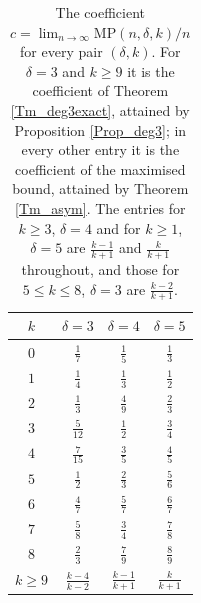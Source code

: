 \documentclass[12pt,a4paper]{article}%
\begin{document}
\begin{table}[htbp]
\begin{center}
\begin{tabular}{|c|c|c|c|}
\hline
$k$ & $\delta =3$ & $\delta =4$ & $\delta =5$\\ \hline
$0$ & $\frac{1}{7}$ & $\frac{1}{5}$ & $\frac{1}{3}$\\[1mm]
$1$ & $\frac{1}{4}$ & $\frac{1}{3}$ & $\frac{1}{2}$\\[1mm]
$2$ & $\frac{1}{3}$ & $\frac{4}{9}$ & $\frac{2}{3}$\\[1mm]
$3$ & $\frac{5}{12}$ & $\frac{1}{2}$ & $\frac{3}{4}$\\[1mm]
$4$ & $\frac{7}{15}$ & $\frac{3}{5}$ & $\frac{4}{5}$\\[1mm]
$5$ & $\frac{1}{2}$ & $\frac{2}{3}$ & $\frac{5}{6}$\\[1mm]
$6$ & $\frac{4}{7}$ & $\frac{5}{7}$ & $\frac{6}{7}$\\[1mm]
$7$ & $\frac{5}{8}$ & $\frac{3}{4}$ & $\frac{7}{8}$\\[1mm]
$8$ & $\frac{2}{3}$ & $\frac{7}{9}$ & $\frac{8}{9}$\\[1mm]
$k\geq 9$ & $\frac{k-4}{k-2}$ & $\frac{k-1}{k+1}$ & $\frac{k}{k+1}$\\ \hline
\end{tabular}
\end{center}
\caption{The coefficient $c=\lim_{n\to \infty }\mathrm{MP}(n,\delta ,k)/n$ for every pair
$(\delta ,k)$. For $\delta =3$ and $k\geq 9$ it is the coefficient of Theorem \ref{Tm_deg3exact},
attained by Proposition \ref{Prop_deg3}; in every other entry it is the coefficient of the maximised
bound, attained by Theorem \ref{Tm_asym}. The entries for $k\geq 3$, $\delta =4$ and for $k\geq 1$,
$\delta =5$ are $\frac{k-1}{k+1}$ and $\frac{k}{k+1}$ throughout, and those for $5\leq k\leq 8$,
$\delta =3$ are $\frac{k-2}{k+1}$.}%
\label{Tab_coeff}%
\end{table}
\end{document}
